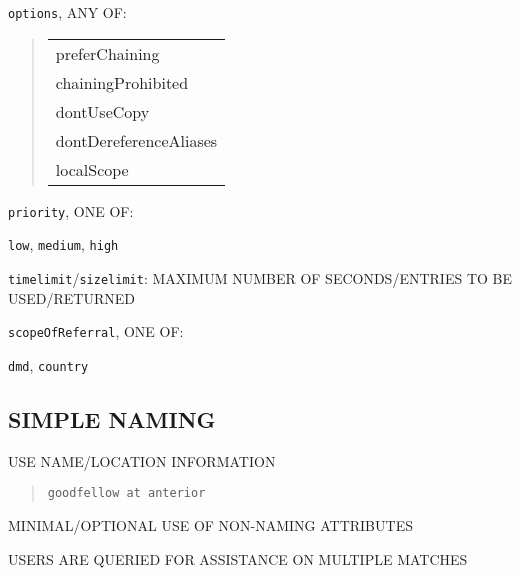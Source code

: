 \begin{bwslide}

\begin{nrtc}
\item \verb"options", ANY OF:
\begin{quote}\begin{tabular}{l}
preferChaining\\
chainingProhibited\\
dontUseCopy\\
dontDereferenceAliases\\
localScope
\end{tabular}\end{quote}

\item \verb"priority", ONE OF:
    \begin{nrtc}
    \item	\verb"low", \verb"medium", \verb"high"
    \end{nrtc}

\item \verb"timelimit"/\verb"sizelimit": MAXIMUM NUMBER OF SECONDS/ENTRIES TO
BE USED/RETURNED

\item \verb"scopeOfReferral", ONE OF:
    \begin{nrtc}
    \item	\verb"dmd", \verb"country"
    \end{nrtc}
\end{nrtc}
\end{bwslide}


\begin{bwslide}
\part*	{SIMPLE NAMING}\bf

\begin{nrtc}
\item	USE NAME/LOCATION INFORMATION
\begin{quote}\small\begin{verbatim}
goodfellow at anterior
\end{verbatim}\end{quote}

\item	MINIMAL/OPTIONAL USE OF NON-NAMING ATTRIBUTES

\item	USERS ARE QUERIED FOR ASSISTANCE ON MULTIPLE MATCHES
\end{nrtc}
\end{bwslide}


